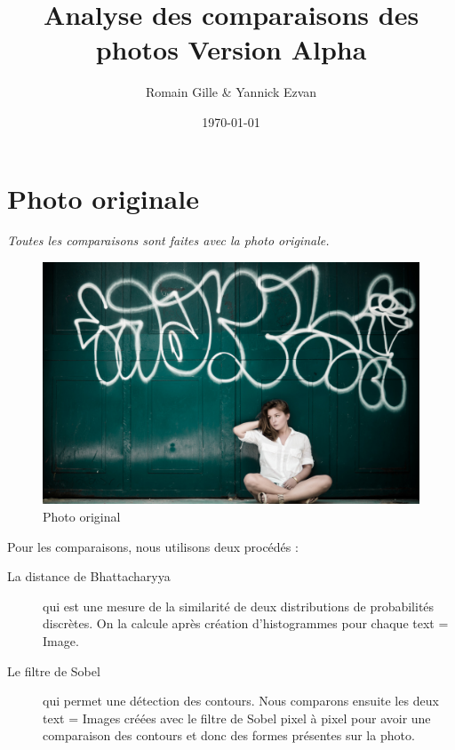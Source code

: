 \documentclass[]{article}
\title{Analyse des comparaisons des photos Version Alpha}
\author{Romain Gille \& Yannick Ezvan}
\date{\today}
\begin{document}
\maketitle

{
\hypersetup{linkcolor=black}
\setcounter{tocdepth}{3}
\tableofcontents
}



\newpage

\section{Photo originale}\label{photo-originale}

\emph{Toutes les comparaisons sont faites avec la photo originale.}

\begin{figure}[htbp]
\centering
\includegraphics{photos/original.jpg}
\caption{Photo original}
\end{figure}

Pour les comparaisons, nous utilisons deux procédés :

\begin{description}
\item[La distance de Bhattacharyya] qui est une mesure de la similarité de deux
  distributions de probabilités discrètes. On la calcule après création
  d'histogrammes pour chaque text = Image.
\item[Le filtre de Sobel] qui permet une détection des contours. Nous comparons
  ensuite les deux text = Images créées avec le filtre de Sobel pixel à pixel pour
  avoir une comparaison des contours et donc des formes présentes sur la photo.
\end{description}
\end{document}
